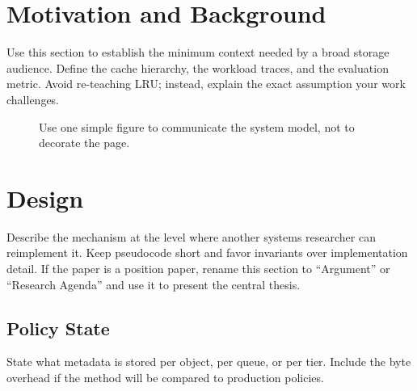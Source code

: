 \documentclass[sigconf,10pt,anonymous,review]{acmart}
\begin{document}
\section{Motivation and Background}
\label{sec:motivation}

Use this section to establish the minimum context needed by a broad storage
audience. Define the cache hierarchy, the workload traces, and the evaluation
metric. Avoid re-teaching LRU; instead, explain the exact assumption your work
challenges.

\begin{figure}[t]
  \centering
  \caption{Use one simple figure to communicate the system model, not to
  decorate the page.}
  \label{fig:model}
\end{figure}

\section{Design}
\label{sec:design}

Describe the mechanism at the level where another systems researcher can
reimplement it. Keep pseudocode short and favor invariants over implementation
detail. If the paper is a position paper, rename this section to ``Argument''
or ``Research Agenda'' and use it to present the central thesis.

\subsection{Policy State}
State what metadata is stored per object, per queue, or per tier. Include the
byte overhead if the method will be compared to production policies.
\end{document}
